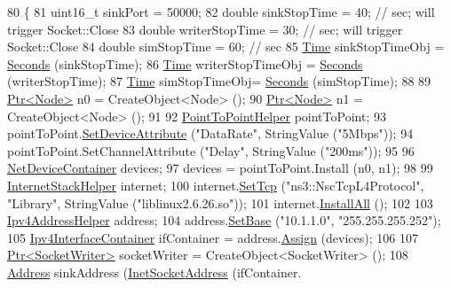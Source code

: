 \begin{DoxyCode}
80 \{
81   uint16\_t sinkPort = 50000;
82   \textcolor{keywordtype}{double} sinkStopTime = 40;  \textcolor{comment}{// sec; will trigger Socket::Close}
83   \textcolor{keywordtype}{double} writerStopTime = 30;  \textcolor{comment}{// sec; will trigger Socket::Close}
84   \textcolor{keywordtype}{double} simStopTime = 60;  \textcolor{comment}{// sec}
85   \hyperlink{classns3_1_1Time}{Time} sinkStopTimeObj = \hyperlink{group__timecivil_ga33c34b816f8ff6628e33d5c8e9713b9e}{Seconds} (sinkStopTime);
86   \hyperlink{classns3_1_1Time}{Time} writerStopTimeObj = \hyperlink{group__timecivil_ga33c34b816f8ff6628e33d5c8e9713b9e}{Seconds} (writerStopTime);
87   \hyperlink{classns3_1_1Time}{Time} simStopTimeObj= \hyperlink{group__timecivil_ga33c34b816f8ff6628e33d5c8e9713b9e}{Seconds} (simStopTime);
88 
89   \hyperlink{classns3_1_1Ptr}{Ptr<Node>} n0 = CreateObject<Node> ();
90   \hyperlink{classns3_1_1Ptr}{Ptr<Node>} n1 = CreateObject<Node> ();
91 
92   \hyperlink{classns3_1_1PointToPointHelper}{PointToPointHelper} pointToPoint;
93   pointToPoint.\hyperlink{classns3_1_1PointToPointHelper_a4577f5ab8c387e5528af2e0fbab1152e}{SetDeviceAttribute} (\textcolor{stringliteral}{"DataRate"}, StringValue (\textcolor{stringliteral}{"5Mbps"}));
94   pointToPoint.SetChannelAttribute (\textcolor{stringliteral}{"Delay"}, StringValue (\textcolor{stringliteral}{"200ms"}));
95 
96   \hyperlink{classns3_1_1NetDeviceContainer}{NetDeviceContainer} devices;
97   devices = pointToPoint.Install (n0, n1);
98 
99   \hyperlink{classns3_1_1InternetStackHelper}{InternetStackHelper} internet;
100   internet.\hyperlink{classns3_1_1InternetStackHelper_ac76e9cf493ef559f311c4ef85945129f}{SetTcp} (\textcolor{stringliteral}{"ns3::NscTcpL4Protocol"}, \textcolor{stringliteral}{"Library"}, StringValue (\textcolor{stringliteral}{"liblinux2.6.26.so"}));
101   internet.\hyperlink{classns3_1_1InternetStackHelper_a6cfa73782fd4071c4cfbd73ebf1bbb44}{InstallAll} ();
102 
103   \hyperlink{classns3_1_1Ipv4AddressHelper}{Ipv4AddressHelper} address;
104   address.\hyperlink{classns3_1_1Ipv4AddressHelper_acf7b16dd25bac67e00f5e25f90a9a035}{SetBase} (\textcolor{stringliteral}{"10.1.1.0"}, \textcolor{stringliteral}{"255.255.255.252"});
105   \hyperlink{classns3_1_1Ipv4InterfaceContainer}{Ipv4InterfaceContainer} ifContainer = address.\hyperlink{classns3_1_1Ipv4AddressHelper_af8e7f4a1a7e74c00014a1eac445a27af}{Assign} (devices);
106 
107   \hyperlink{classns3_1_1Ptr}{Ptr<SocketWriter>} socketWriter = CreateObject<SocketWriter> ();
108   \hyperlink{classns3_1_1Address}{Address} sinkAddress (\hyperlink{classns3_1_1InetSocketAddress}{InetSocketAddress} (ifContainer.

\end{DoxyCode}
